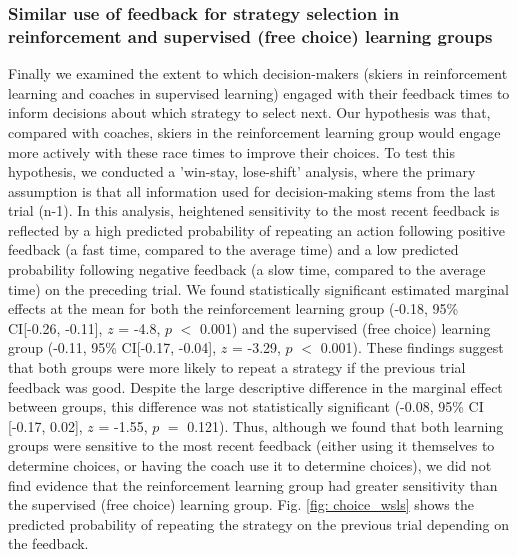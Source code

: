 \documentclass[pdflatex,sn-nature]{sn-jnl}%
\theoremstyle{thmstyleone}%
\theoremstyle{thmstyletwo}%
\theoremstyle{thmstylethree}%
\begin{document}
\subsubsection{Similar use of feedback for strategy selection in reinforcement 
 and supervised (free choice) learning groups }\label{result_strategychoice_wsls}
Finally we examined the extent to which decision-makers (skiers in reinforcement learning and coaches in supervised learning) engaged with their feedback times to inform decisions about which strategy to select next. Our hypothesis was that, compared with coaches, skiers in the reinforcement learning group would engage more actively with these race times to improve their choices. To test this hypothesis, we conducted a 'win-stay, lose-shift' analysis, where the primary assumption is that all information used for decision-making stems from the last trial (n-1)\cite{worthy_comparison_2014, iyer_probing_2020}. In this analysis, heightened sensitivity to the most recent feedback is reflected by a high predicted probability of repeating an action following positive feedback (a fast time, compared to the average time) and a low predicted probability following negative feedback (a slow time, compared to the average time) on the preceding trial. We found statistically significant estimated marginal effects at the mean for both the reinforcement learning group (-0.18, 95\% CI[-0.26, -0.11], $z$ = -4.8, $p$ $<$ 0.001) and the supervised (free choice) learning group (-0.11, 95\% CI[-0.17, -0.04], $z$ = -3.29, $p$ $<$ 0.001). These findings suggest that both groups were more likely to repeat a strategy if the previous trial feedback was good. Despite the large descriptive difference in the marginal effect between groups, this difference was not statistically  significant (-0.08, 95\% CI [-0.17, 0.02], $z$ = -1.55, $p$ $=$ 0.121). Thus, although we found that both learning groups were sensitive to the most recent feedback (either using it themselves to determine choices, or having the coach use it to determine choices), we did not find evidence that the reinforcement learning group had greater sensitivity than the supervised (free choice) learning group. Fig. \ref{fig: choice_wsls} shows the predicted probability of repeating the strategy on the previous trial depending on the feedback. 
\end{document}
